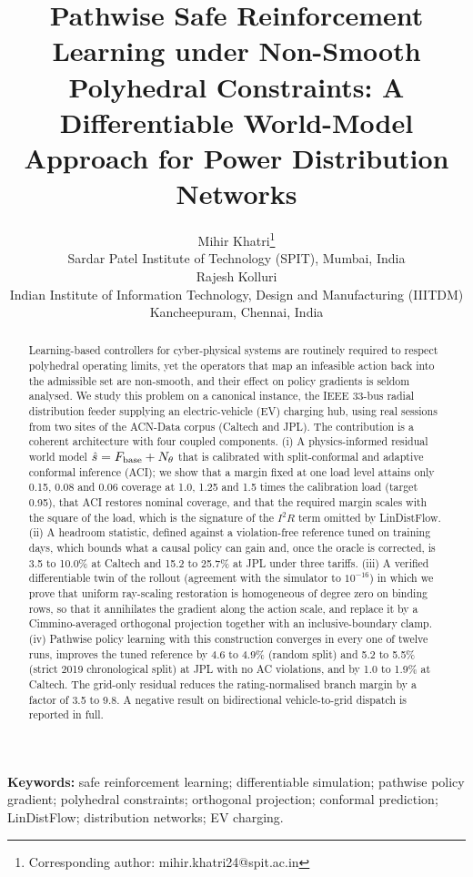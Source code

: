 \documentclass[11pt]{article}
\title{Pathwise Safe Reinforcement Learning under Non-Smooth Polyhedral Constraints: A Differentiable World-Model Approach for Power Distribution Networks}
\author{Mihir Khatri\thanks{Corresponding author: mihir.khatri24@spit.ac.in}\\ \small Sardar Patel Institute of Technology (SPIT), Mumbai, India\\[4pt]
Rajesh Kolluri\\ \small Indian Institute of Information Technology, Design and Manufacturing (IIITDM) Kancheepuram, Chennai, India}
\date{}
\begin{document}
\maketitle

\begin{abstract}
Learning-based controllers for cyber-physical systems are routinely required to respect polyhedral operating limits, yet the operators that map an infeasible action back into the admissible set are non-smooth, and their effect on policy gradients is seldom analysed. We study this problem on a canonical instance, the IEEE 33-bus radial distribution feeder supplying an electric-vehicle (EV) charging hub, using real sessions from two sites of the ACN-Data corpus (Caltech and JPL). The contribution is a coherent architecture with four coupled components. (i) A physics-informed residual world model $\hat s=F_{\rm base}+N_\theta$ that is calibrated with split-conformal and adaptive conformal inference (ACI); we show that a margin fixed at one load level attains only 0.15, 0.08 and 0.06 coverage at 1.0, 1.25 and 1.5 times the calibration load (target 0.95), that ACI restores nominal coverage, and that the required margin scales with the square of the load, which is the signature of the $I^2R$ term omitted by LinDistFlow. (ii) A headroom statistic, defined against a violation-free reference tuned on training days, which bounds what a causal policy can gain and, once the oracle is corrected, is 3.5 to 10.0\% at Caltech and 15.2 to 25.7\% at JPL under three tariffs. (iii) A verified differentiable twin of the rollout (agreement with the simulator to $10^{-16}$) in which we prove that uniform ray-scaling restoration is homogeneous of degree zero on binding rows, so that it annihilates the gradient along the action scale, and replace it by a Cimmino-averaged orthogonal projection together with an inclusive-boundary clamp. (iv) Pathwise policy learning with this construction converges in every one of twelve runs, improves the tuned reference by 4.6 to 4.9\% (random split) and 5.2 to 5.5\% (strict 2019 chronological split) at JPL with no AC violations, and by 1.0 to 1.9\% at Caltech. The grid-only residual reduces the rating-normalised branch margin by a factor of 3.5 to 9.8. A negative result on bidirectional vehicle-to-grid dispatch is reported in full.
\end{abstract}
\textbf{Keywords:} safe reinforcement learning; differentiable simulation; pathwise policy gradient; polyhedral constraints; orthogonal projection; conformal prediction; LinDistFlow; distribution networks; EV charging.
\end{document}
